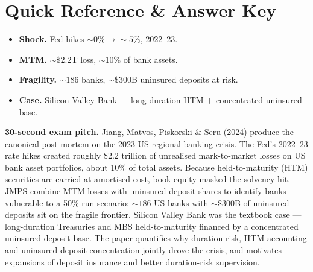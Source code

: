 \documentclass[11pt]{article}
\begin{document}
\section*{Quick Reference \& Answer Key}
\begin{answerbox}
\begin{itemize}
\item \textbf{Shock.} Fed hikes $\sim 0\%\to\sim 5\%$, 2022--23.
\item \textbf{MTM.} $\sim\$2.2$T loss, $\sim 10\%$ of bank assets.
\item \textbf{Fragility.} $\sim 186$ banks, $\sim\$300$B uninsured deposits at risk.
\item \textbf{Case.} Silicon Valley Bank --- long duration HTM $+$ concentrated uninsured base.
\end{itemize}
\end{answerbox}

\begin{keybox}
\textbf{30-second exam pitch.} Jiang, Matvos, Piskorski \& Seru (2024) produce the canonical post-mortem on the 2023 US regional banking crisis. The Fed's 2022--23 rate hikes created roughly \$2.2 trillion of unrealised mark-to-market losses on US bank asset portfolios, about 10\% of total assets. Because held-to-maturity (HTM) securities are carried at amortised cost, book equity masked the solvency hit. JMPS combine MTM losses with uninsured-deposit shares to identify banks vulnerable to a 50\%-run scenario: $\sim 186$ US banks with $\sim\$300$B of uninsured deposits sit on the fragile frontier. Silicon Valley Bank was the textbook case --- long-duration Treasuries and MBS held-to-maturity financed by a concentrated uninsured deposit base. The paper quantifies why duration risk, HTM accounting and uninsured-deposit concentration jointly drove the crisis, and motivates expansions of deposit insurance and better duration-risk supervision.
\end{keybox}
\end{document}
